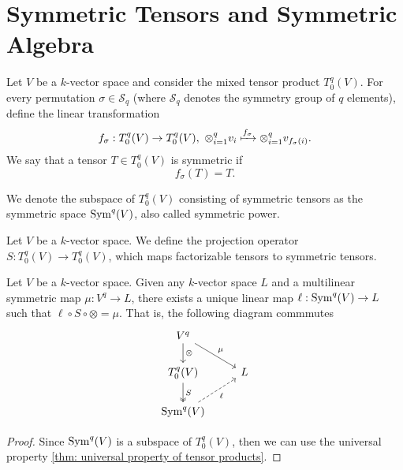 \section{Symmetric Tensors and Symmetric Algebra}

\begin{definition}
  Let \(V\) be a \(k\)-vector space and consider the mixed tensor product
  \(T_0^q(V)\). For every permutation \(\sigma \in \mathcal S_q\) (where
  \(\mathcal S_q\) denotes the symmetry group of \(q\) elements), define the
  linear transformation
  \[
    f_\sigma: T_0^q(V) \to T_0^q(V),\ \otimes_{i=1}^q v_i \xmapsto{f_\sigma}
    \otimes_{i=1}^q v_{f_\sigma(i)}.
  \] 
  We say that a tensor \(T \in T_0^q(V)\) is symmetric if
  \[
     f_\sigma(T) = T.
  \] 
\end{definition}

\begin{definition}
  We denote the subspace of \(T_0^q(V)\) consisting of symmetric tensors as the
  symmetric space \(\operatorname{Sym}^q(V)\), also called symmetric power.
\end{definition}

\begin{definition}
  Let \(V\) be a \(k\)-vector space. We define the projection operator \(S:
  T_0^q(V) \to T_0^q(V)\), which maps factorizable tensors to symmetric tensors.
\end{definition}

\begin{proposition}
  Let \(V\) be a \(k\)-vector space. Given any \(k\)-vector space \(L\) and a
  multilinear symmetric map \(\mu: V^q \to L\), there exists a unique linear map
  \(\ell: \operatorname{Sym}^q(V) \to L\) such that \(\ell \circ S \circ \otimes = \mu\). That
  is, the following diagram commmutes
  \[
    \begin{tikzcd}
      V^q \ar[rd, "\mu"] \ar[d, "\otimes"] \\
      T_0^q(V) \ar[d, two heads, "S"]
          &L \\
      \Sym^q(V) \ar[ru, dashed, swap, "\ell"]
    \end{tikzcd}
  \] 
\end{proposition}

\begin{proof}
  Since \(\operatorname{Sym}^q(V)\) is a subspace of \(T_0^q(V)\), then we can use the
  universal property \cref{thm: universal property of tensor products}.
\end{proof}

